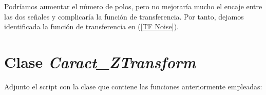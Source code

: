 \documentclass[a4paper, fontsize=11pt]{scrartcl} %
\numberwithin{equation}{section} %
\numberwithin{figure}{section} %
\numberwithin{table}{section} %
\begin{document}
	Podríamos aumentar el número de polos, pero no mejoraría mucho el encaje entre las dos señales y complicaría la función de transferencia. Por tanto, dejamos identificada la función de transferencia en (\ref{TF Noise}).
	
	\section{Clase \textit{Caract\_ZTransform}}
	
	Adjunto el script con la clase que contiene las funciones anteriormente empleadas:
	
	
	
\end{document}
